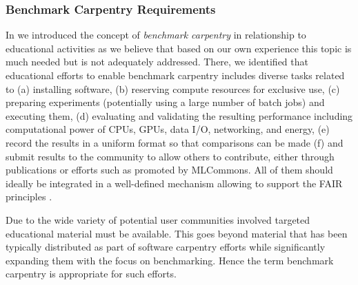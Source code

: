 \documentclass[sigconf]{acmart}
\begin{document}
\subsubsection{Benchmark Carpentry Requirements}
\label{sec:carpentry}

In \citep{las-frontiers-edu} we introduced the concept of {\em benchmark carpentry} in relationship to educational activities as we believe that based on our own experience this topic is much needed but is not adequately addressed. There, we identified that educational efforts to enable benchmark carpentry includes diverse tasks related to  (a) installing software, (b) reserving compute resources for exclusive use, (c) preparing experiments (potentially using a large number of batch jobs) and executing them, (d) evaluating and validating the resulting performance including computational power of CPUs, GPUs, data I/O, networking, and energy, (e) record the results in a uniform format so that comparisons can be made (f) and submit results to the community to allow others to contribute, either through publications or efforts such as promoted by MLCommons. All of them should ideally be integrated in a well-defined mechanism allowing to support the FAIR principles \citep{wilkinson2016fair}.

Due to the wide variety of potential user communities involved targeted educational material must be available. This goes beyond material that has been typically distributed as part of software carpentry \citep{software-carpentry} efforts while significantly expanding them with the focus on benchmarking. Hence the term benchmark carpentry is appropriate for such efforts. 
\end{document}
